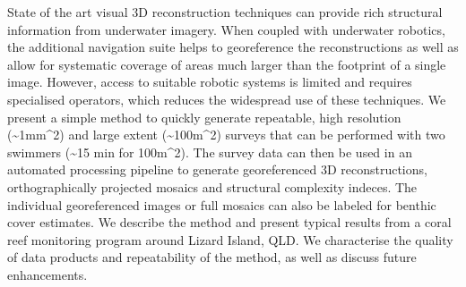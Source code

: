 
State of the art visual 3D reconstruction techniques can provide rich structural information from underwater imagery. When coupled with underwater robotics, the additional navigation suite helps to georeference the reconstructions as well as allow for systematic coverage of areas much larger than the footprint of a single image. However, access to suitable robotic systems is limited and requires specialised operators, which reduces the widespread use of these techniques.
We present a simple method to quickly generate repeatable, high resolution (\sim{1mm^{2}}) and large extent (\sim{100m^{2}}) surveys that can be performed with two swimmers (\sim{15 min} for {100m^{2}}). The survey data can then be used in an automated processing pipeline to generate georeferenced 3D reconstructions, orthographically projected mosaics and structural complexity indeces. The individual georeferenced images or full mosaics can also be labeled for benthic cover estimates.
We describe the method and present typical results from a coral reef monitoring program around Lizard Island, QLD. We characterise the quality of data products and repeatability of the method, as well as discuss future enhancements.
  
  
